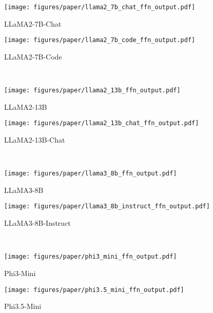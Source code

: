 \begin{figure*}[!t]
    \centering
    \begin{subfigure}[t]{0.49\textwidth}
        \texttt{[image: figures/paper/llama2\_7b\_chat\_ffn\_output.pdf]}
        \caption{LLaMA2-7B-Chat}\label{fig:llama2_7b_chat_ffn_output}
    \end{subfigure}
    \begin{subfigure}[t]{0.49\textwidth}
        \texttt{[image: figures/paper/llama2\_7b\_code\_ffn\_output.pdf]}
        \caption{LLaMA2-7B-Code}\label{fig:llama2_7b_code_ffn_output}
    \end{subfigure}\\
    \begin{subfigure}[t]{0.49\textwidth}
        \texttt{[image: figures/paper/llama2\_13b\_ffn\_output.pdf]}
        \caption{LLaMA2-13B}\label{fig:llama2_13b_ffn_output}
    \end{subfigure}
    \begin{subfigure}[t]{0.49\textwidth}
        \texttt{[image: figures/paper/llama2\_13b\_chat\_ffn\_output.pdf]}
        \caption{LLaMA2-13B-Chat}\label{fig:llama2_13b_chat_ffn_output}
    \end{subfigure}\\
    \begin{subfigure}[t]{0.49\textwidth}
        \texttt{[image: figures/paper/llama3\_8b\_ffn\_output.pdf]}
        \caption{LLaMA3-8B}\label{fig:llama3_8b_ffn_output}
    \end{subfigure}
    \begin{subfigure}[t]{0.49\textwidth}
        \texttt{[image: figures/paper/llama3\_8b\_instruct\_ffn\_output.pdf]}
        \caption{LLaMA3-8B-Instruct}\label{fig:llama3_8b_instruct_ffn_output}
    \end{subfigure}\\
    \begin{subfigure}[t]{0.49\textwidth}
        \texttt{[image: figures/paper/phi3\_mini\_ffn\_output.pdf]}
        \caption{Phi3-Mini}\label{fig:phi3_mini_ffn_output}
    \end{subfigure}
    \begin{subfigure}[t]{0.49\textwidth}
        \texttt{[image: figures/paper/phi3.5\_mini\_ffn\_output.pdf]}
        \caption{Phi3.5-Mini}\label{fig:phi3.5_mini_ffn_output}
    \end{subfigure}\\
    \begin{subfigure}[t]{0.49\textwidth}

\end{subfigure}
\end{figure*}
